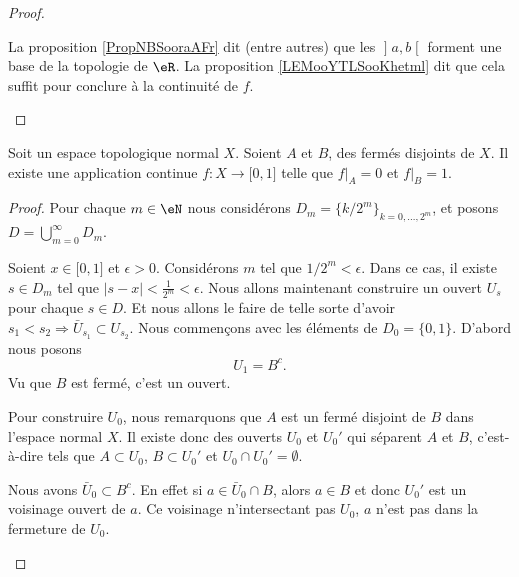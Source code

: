\begin{proof}
\begin{subproof}
			La proposition \ref{PropNBSooraAFr} dit (entre autres) que les \( \mathopen] a , b \mathclose[\) forment une base de la topologie de \( \eR\). La proposition \ref{LEMooYTLSooKhetml} dit que cela suffit pour conclure à la continuité de \( f\).
	\end{subproof}
\end{proof}


\begin{theorem}     \label{THOooKYYEooLFcNpg}
	Soit un espace topologique normal \( X\). Soient \( A\) et \( B\), des fermés disjoints de \( X\). Il existe une application continue \( f\colon X\to \mathopen[ 0 , 1 \mathclose]\) telle que \( f|_A=0\) et \( f|_B=1\).
\end{theorem}

\begin{proof}
	Pour chaque \( m\in \eN\) nous considérons \( D_m=\{ k/2^m \}_{k=0,\ldots, 2^m}\), et posons \( D=\bigcup_{m=0}^{\infty}D_m\).
	\begin{subproof}
		Soient \( x\in\mathopen[ 0 , 1 \mathclose]\) et \( \epsilon>0\). Considérons \( m\) tel que \( 1/2^m<\epsilon\). Dans ce cas, il existe \( s\in D_m\) tel que \( | s-x |<\frac{1}{ 2^m }<\epsilon\).
		Nous allons maintenant construire un ouvert \( U_s\) pour chaque \( s\in D\). Et nous allons le faire de telle sorte d'avoir \( s_1<s_2\Rightarrow \bar U_{s_1}\subset U_{s_2}\).
		\spitem[Pour \( s\in D_0\)]
		Nous commençons avec les éléments de \( D_0=\{ 0,1 \}\). D'abord nous posons
		\begin{equation}
			U_1=B^c.
		\end{equation}
		Vu que \( B\) est fermé, c'est un ouvert.

		Pour construire \( U_0\), nous remarquons que \( A\) est un fermé disjoint de \( B\) dans l'espace normal \( X\). Il existe donc des ouverts \( U_0\) et \( U_0'\) qui séparent \( A\) et \( B\), c'est-à-dire tels que \( A\subset U_0\), \( B\subset U_0'\) et \( U_0\cap U_0'=\emptyset\).

		Nous avons \( \bar U_0\subset B^c\). En effet si \( a\in \bar U_0\cap B\), alors \( a\in B\) et donc \( U_0'\) est un voisinage ouvert de \( a\). Ce voisinage n'intersectant pas \( U_0\), \( a\) n'est pas dans la fermeture de \( U_0\).


\end{subproof}
\end{proof}
